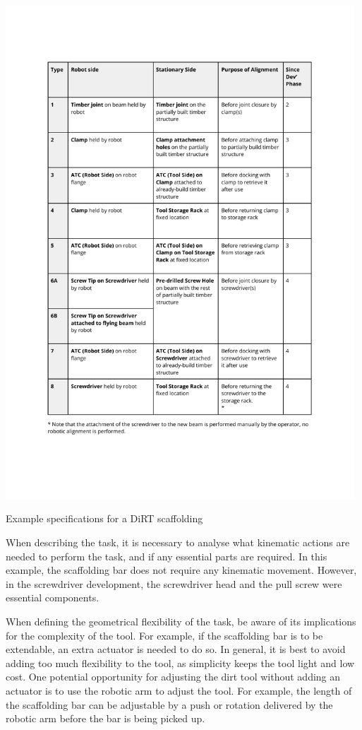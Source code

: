 \begin{table}[h!]
    \includegraphics[page=9, trim=25.4mm 130mm 25.4mm 33mm, clip, width=0.98\textwidth]{tables/Tables in Chapter 9 to 11.pdf}
    \caption{Example specifications for a DiRT scaffolding}
    \label{table:example-specification-dirt-scaffolding}
\end{table}

\FloatBarrier

When describing the task, it is necessary to analyse what kinematic actions are needed to perform the task, and if any essential parts are required. In this example, the scaffolding bar does not require any kinematic movement. However, in the screwdriver development, the screwdriver head and the pull screw were essential components.

When defining the geometrical flexibility of the task, be aware of its implications for the complexity of the tool. For example, if the scaffolding bar is to be extendable, an extra actuator is needed to do so. In general, it is best to avoid adding too much flexibility to the tool, as simplicity keeps the tool light and low cost. One potential opportunity for adjusting the dirt tool without adding an actuator is to use the robotic arm to adjust the tool. For example, the length of the scaffolding bar can be adjustable by a push or rotation delivered by the robotic arm before the bar is being picked up.

